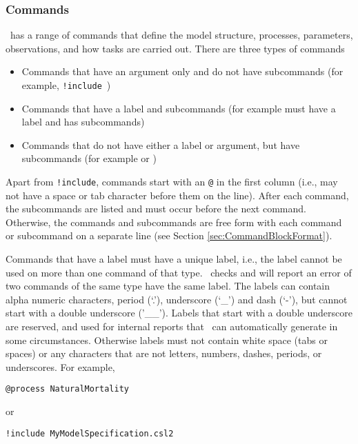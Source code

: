 \subsubsection{Commands}

\CNAME\ has a range of commands that define the model structure, processes, parameters, observations, and how tasks are carried out. There are three types of commands

\begin{itemize}
	\item Commands that have an argument only and do not have subcommands (for example, \texttt{!include}\ )
	\item Commands that have a label and subcommands (for example  must have a label and has subcommands)
	\item Commands that do not have either a label or argument, but have subcommands (for example  or )
\end{itemize}

Apart from \texttt{!include}, commands start with an \texttt{@} in the first column (i.e., may not have a space or tab character before them on the line). After each command, the subcommands are listed and must occur before the next command. Otherwise, the commands and subcommands are free form with each command or subcommand on a separate line (see Section \ref{sec:CommandBlockFormat}).

Commands that have a label must have a unique label, i.e., the label cannot be used on more than one command of that type. \CNAME\ checks and will report an error of two commands of the same type have the same label. The labels can contain alpha numeric characters, period (`.'), underscore (`\_') and dash (`-'), but cannot start with a double underscore ('\_\_'). Labels that start with a double underscore are reserved, and used for internal reports that \CNAME\ can automatically generate in some circumstances. Otherwise labels must not contain white space (tabs or spaces) or any characters that are not letters, numbers, dashes, periods, or underscores. For example,

{\small{\begin{verbatim}
@process NaturalMortality
\end{verbatim}}}
or
{\small{\begin{verbatim}
!include MyModelSpecification.csl2
\end{verbatim}}}

